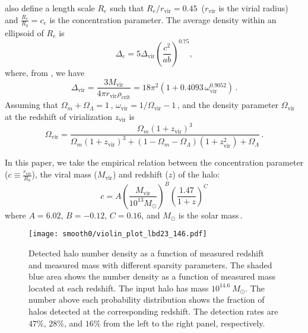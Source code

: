 \documentclass[twocolumn, usenames, dvipsnames]{aastex63}
\begin{document}
\citet{halo_JS02} also define a length scale $R_e$ such that
$R_e/r_{\text{vir}} = 0.45$\, ($r_{\text{vir}}$ is the virial radius) and
$\frac{R_e}{R_0} = c_e$ is the concentration parameter. The average density
within an ellipsoid of $R_e$ is
\begin{equation}
    \Delta_e  = 5\Delta_{\text{vir}} (\frac{c^2}{ab})^{0.75},
\end{equation}
where, from \citet{halo_Oguri_2001}, we have
\begin{equation}
    \Delta_{\text{vir}} = \frac{3M_{\text{vir}}}{4\pi r_{\text{vir}}
    \rho _{\text{crit}}}
    = 18\pi^2 (1 + 0.4093\, \omega_{\text{vir}}^{0.9052})\,.
\end{equation}
Assuming that $\Omega_{m} + \Omega_{\Lambda} = 1$\,, $\omega_{\text{vir}} =
1/\Omega_{\text{vir}} - 1$\,, and the density parameter $\Omega_{\text{vir}}$
at the redshift of virialization $z_{\text{vir}}$ is \citep{Oguri_2001}
\begin{equation}
\Omega_{\text{vir}} = \frac{\Omega_{m} (1+z_{\text{vir}})^3}{\Omega_{m} (1+z_{\text{vir}})^3
    + (1-\Omega_{m} - \Omega_{\Lambda})(1 + z_{\text{vir}}^2) + \Omega_{\Lambda}}\,.
\end{equation}

In this paper, we take the empirical relation between the concentration
parameter ($c \equiv \frac{r_{\mathrm{vir}}}{R_0}$), the viral mass
($M_{\mathrm{vir}}$) and redshift ($z$) of the halo:
\begin{equation}
    c = A \left(\frac{M_{\mathrm{vir}}}{10^{13}M_{\odot}}\right)^B \left(\frac{1.47}{1+z}\right)^C
\end{equation}
where $A = 6.02$, $B=-0.12$, $C = 0.16$, and $M_{\odot}$ is the solar
mass\,\citep{Child2018}.

\begin{figure*}[!ht]
\centering
\texttt{[image: smooth0/violin\_plot\_lbd23\_146.pdf]}
\caption{
    Detected halo number density as a function of measured redshift and
    measured mass with different sparsity parameters. The shaded blue area
    shows the number density as a function of measured mass located at each
    redshift. The input halo has mass $10^{14.6}~M_{\odot}$. The number above
    each probability distribution shows the fraction of halos detected at the
    corresponding redshift. The detection rates are $47\%$, $28\%$, and $16\%$
    from the left to the right panel, respectively.
    }
    \label{ViolinPlot14.6}
\end{figure*}
\end{document}
